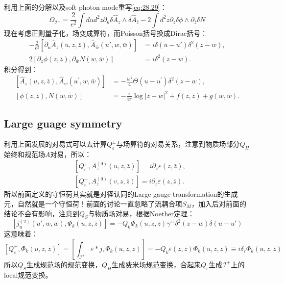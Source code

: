 利用上面的分解以及soft photon mode重写\ref{eq:28.29}：
\begin{equation}
	\Omega_{\mathcal{I}^{+}}=\frac{2}{e^{2}}\int dud^{2}z\partial_{u}\delta\hat{A}_{z}\wedge\delta\hat{A}_{\bar{z}}-2\int d^{2}z\partial_{z}\delta\phi\wedge\partial_{\bar{z}}\delta N
\end{equation}
现在考虑正则量子化，场变成算符，而Poisson括号换成Dirac括号：
\begin{equation}
	\begin{aligned}-\frac{2}{e^2}\left[\partial_u\hat A_z(u,z,\bar z),\hat A_{\bar w}(u',w,\bar w)\right]&=i\delta(u-u')\delta^2(z-w),\\2\left[\partial_z\phi(z,\bar z),\partial_{\bar w}N(w,\bar w)\right]&=i\delta^2(z-w).\end{aligned}
\end{equation}
积分得到：
\begin{equation}
	\begin{aligned}
		\left[\hat{A}_{z}(u,z,\bar{z}),\hat{A}_{\bar{w}}(u^{\prime},w,\bar{w})\right]& =-\frac{ie^{2}}{4}\Theta(u-u^{\prime})\delta^{2}(z-w),  \\
		[\phi(z,\bar{z}),N(w,\bar{w})]& =-\frac{i}{4\pi}\log|z-w|^{2}+f(z,\bar{z})+g(w,\bar{w}). 
	\end{aligned}
\end{equation}

\subsection{Large guage symmetry}
利用上面发展的对易式可以去计算$Q_\varepsilon^{\pm}$与场算符的对易关系，注意到物质场部分$Q_H$始终和规范场$A$对易，所以：
\begin{equation}
	\begin{aligned}&\left[Q_{\varepsilon}^{+},A_{z}^{(0)}(u,z,\bar{z})\right]=i\partial_{z}\varepsilon(z,\bar{z}),\\&\left[Q_{\varepsilon}^{-},A_{z}^{(0)}(v,z,\bar{z})\right]=i\partial_{z}\varepsilon(z,\bar{z}).\end{aligned}
\end{equation}
所以前面定义的守恒荷其实就是对径认同的Large gauge transformation的生成元，自然就是一个守恒荷！前面的讨论一直忽略了流耦合项$S_M$，加入后对前面的结论不会有影响，注意到$Q_S$与物质场对易，根据Noether定理：
\begin{equation}
	\left[j_{u}^{(2)}(u',w,\bar{w}),\Phi_{k}(u,z,\bar{z})\right]=-Q_{k}\Phi_{k}(u,z,\bar{z})\gamma^{z\bar{z}}\delta^{2}(z-w)\delta(u-u')
\end{equation}
这意味着：
\begin{equation}\label{23.36}
	\left[Q_\varepsilon^+,\Phi_k(u,z,\bar{z})\right]=\left[\int_{\mathcal{I}^+}\varepsilon*j,\Phi_k(u,z,\bar{z})\right]=-Q_k\varepsilon(z,\bar{z})\Phi_k(u,z,\bar{z})\equiv i\delta_\varepsilon\Phi_k(u,z,\bar{z})
\end{equation}
所以$Q_S$生成规范场的规范变换，$Q_H$生成费米场规范变换，合起来$Q_\varepsilon$生成$\mathcal{I}^+$上的local规范变换。
